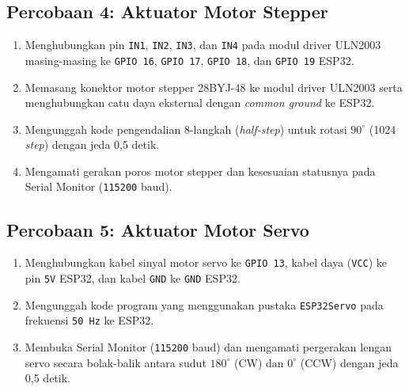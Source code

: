 \subsection{Percobaan 4: Aktuator Motor Stepper}
\begin{enumerate}
    \item Menghubungkan pin \texttt{IN1}, \texttt{IN2}, \texttt{IN3}, dan \texttt{IN4} pada modul driver ULN2003 masing-masing ke \texttt{GPIO 16}, \texttt{GPIO 17}, \texttt{GPIO 18}, dan \texttt{GPIO 19} ESP32.
    \item Memasang konektor motor stepper 28BYJ-48 ke modul driver ULN2003 serta menghubungkan catu daya eksternal dengan \textit{common ground} ke ESP32.
    \item Mengunggah kode pengendalian 8-langkah (\textit{half-step}) untuk rotasi $90^\circ$ (1024 \textit{step}) dengan jeda 0,5 detik.
    \item Mengamati gerakan poros motor stepper dan kesesuaian statusnya pada Serial Monitor (\texttt{115200} baud).
\end{enumerate}

\subsection{Percobaan 5: Aktuator Motor Servo}
\begin{enumerate}
    \item Menghubungkan kabel sinyal motor servo ke \texttt{GPIO 13}, kabel daya (\texttt{VCC}) ke pin \texttt{5V} ESP32, dan kabel \texttt{GND} ke \texttt{GND} ESP32.
    \item Mengunggah kode program yang menggunakan pustaka \texttt{ESP32Servo} pada frekuensi \texttt{50 Hz} ke ESP32.
    \item Membuka Serial Monitor (\texttt{115200} baud) dan mengamati pergerakan lengan servo secara bolak-balik antara sudut $180^\circ$ (CW) dan $0^\circ$ (CCW) dengan jeda 0,5 detik.
\end{enumerate}

